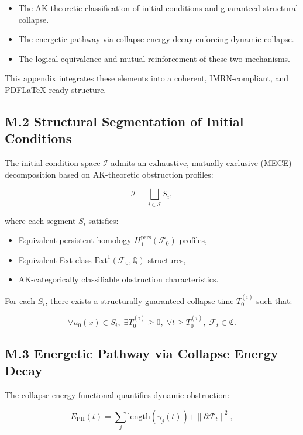 \documentclass[11pt]{article}
\begin{document}
\begin{itemize}
  \item The AK-theoretic classification of initial conditions and guaranteed structural collapse.
  \item The energetic pathway via collapse energy decay enforcing dynamic collapse.
  \item The logical equivalence and mutual reinforcement of these two mechanisms.
\end{itemize}

This appendix integrates these elements into a coherent, IMRN-compliant, and PDFLaTeX-ready structure.

\subsection*{M.2 Structural Segmentation of Initial Conditions}

The initial condition space $\mathcal{I}$ admits an exhaustive, mutually exclusive (MECE) decomposition based on AK-theoretic obstruction profiles:

\[
\mathcal{I} = \bigsqcup_{i \in \mathcal{S}} S_i,
\]

where each segment $S_i$ satisfies:

\begin{itemize}
  \item Equivalent persistent homology $H_1^{\mathrm{pers}}(\mathcal{F}_0)$ profiles,
  \item Equivalent Ext-class $\mathrm{Ext}^1(\mathcal{F}_0, \mathbb{Q})$ structures,
  \item AK-categorically classifiable obstruction characteristics.
\end{itemize}

For each $S_i$, there exists a structurally guaranteed collapse time $T_0^{(i)}$ such that:

\[
\forall u_0(x) \in S_i,\; \exists T_0^{(i)} \geq 0,\; \forall t \geq T_0^{(i)},\; \mathcal{F}_t \in \mathfrak{C}.
\]

\subsection*{M.3 Energetic Pathway via Collapse Energy Decay}

The collapse energy functional quantifies dynamic obstruction:

\[
E_{\mathrm{PH}}(t) = \sum_j \mathrm{length}(\gamma_j(t)) + \|\partial \mathcal{F}_t\|^2,
\]
\end{document}
